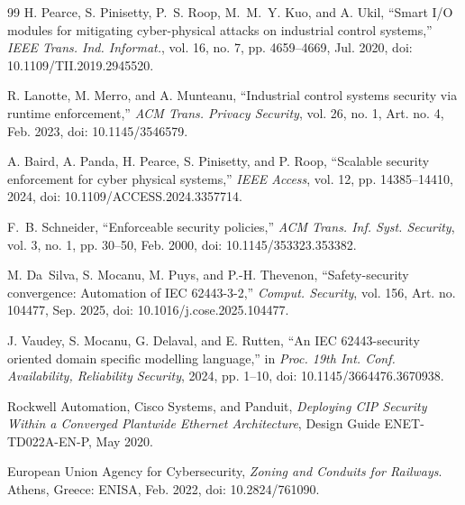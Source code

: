 \begin{thebibliography}{99}
H. Pearce, S. Pinisetty, P.~S. Roop, M.~M.~Y. Kuo, and A. Ukil, ``Smart I/O modules for mitigating cyber-physical attacks on industrial control systems,'' \emph{IEEE Trans. Ind. Informat.}, vol. 16, no. 7, pp. 4659--4669, Jul. 2020, doi: 10.1109/TII.2019.2945520.

R. Lanotte, M. Merro, and A. Munteanu, ``Industrial control systems security via runtime enforcement,'' \emph{ACM Trans. Privacy Security}, vol. 26, no. 1, Art. no. 4, Feb. 2023, doi: 10.1145/3546579.

A. Baird, A. Panda, H. Pearce, S. Pinisetty, and P. Roop, ``Scalable security enforcement for cyber physical systems,'' \emph{IEEE Access}, vol. 12, pp. 14385--14410, 2024, doi: 10.1109/ACCESS.2024.3357714.

F.~B. Schneider, ``Enforceable security policies,'' \emph{ACM Trans. Inf. Syst. Security}, vol. 3, no. 1, pp. 30--50, Feb. 2000, doi: 10.1145/353323.353382.

M. Da~Silva, S. Mocanu, M. Puys, and P.-H. Thevenon, ``Safety-security convergence: Automation of IEC 62443-3-2,'' \emph{Comput. Security}, vol. 156, Art. no. 104477, Sep. 2025, doi: 10.1016/j.cose.2025.104477.

J. Vaudey, S. Mocanu, G. Delaval, and E. Rutten, ``An IEC 62443-security oriented domain specific modelling language,'' in \emph{Proc. 19th Int. Conf. Availability, Reliability Security}, 2024, pp. 1--10, doi: 10.1145/3664476.3670938.

Rockwell Automation, Cisco Systems, and Panduit, \emph{Deploying CIP Security Within a Converged Plantwide Ethernet Architecture}, Design Guide ENET-TD022A-EN-P, May 2020.

European Union Agency for Cybersecurity, \emph{Zoning and Conduits for Railways}. Athens, Greece: ENISA, Feb. 2022, doi: 10.2824/761090.

\end{thebibliography}
